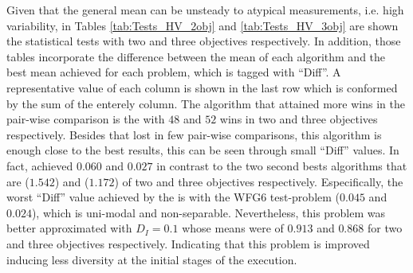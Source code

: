 Given that the general mean can be unsteady to atypical measurements, i.e. high variability, in Tables \ref{tab:Tests_HV_2obj} and \ref{tab:Tests_HV_3obj} are shown the statistical tests with two and three objectives respectively.
%
In addition, those tables incorporate the difference between the mean of each algorithm and the best mean achieved for each problem, which is tagged with ``Diff''.
%
A representative value of each column is shown in the last row which is conformed by the sum of the enterely column.
%
The algorithm that attained more wins in the pair-wise comparison is the \VSDMOEA{} with $48$ and $52$ wins in two and three objectives respectively.
%
Besides that \VSDMOEA{} lost in few pair-wise comparisons, this algorithm is enough close to the best results, this can be seen through small ``Diff'' values.
%
In fact, \VSDMOEA{} achieved $0.060$ and $0.027$ in contrast to the two second bests algorithms that are \NSGAII{} ($1.542$) and \RMOEA{} ($1.172$) of two and three objectives respectively.
%
Especifically, the worst ``Diff'' value achieved by the \VSDMOEA{} is with the WFG6 test-problem ($0.045$ and $0.024$), which is uni-modal and non-separable.
%
Nevertheless, this problem was better approximated with $D_I=0.1$ whose means were of $0.913$ and $0.868$ for two and three objectives respectively.
%
Indicating that this problem is improved inducing less diversity at the initial stages of the execution.
%

%

%
%

